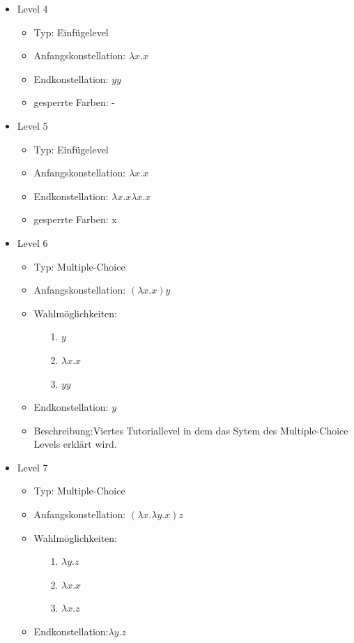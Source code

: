 \begin{itemize}
	\item{Level 4} 
		\begin{itemize}
			\item{Typ:} Einfügelevel
			\item{Anfangskonstellation:} \(\lambda x . x \)    
			\item{Endkonstellation:} \(y y\)
			\item{gesperrte Farben:} - 
		\end{itemize}

	\item{Level 5} 
		\begin{itemize}
			\item{Typ:} Einfügelevel
			\item{Anfangskonstellation:} \(\lambda x . x \)    
			\item{Endkonstellation:}  \(\lambda x . x  \lambda x . x  \)
			\item{gesperrte Farben:} x
		\end{itemize}

	\item{Level 6} 
		\begin{itemize}
			\item{Typ:} Multiple-Choice 
			\item{Anfangskonstellation:} \((\lambda x . x ) y\)    
			\item{Wahlmöglichkeiten:}  
				\begin{itemize}
					\item[1.] \(y\)
					\item[2.] \(\lambda x . x \) 
					\item[3.] \(y y\)
				\end{itemize}
			\item{Endkonstellation:} \(y\)
			\item{Beschreibung:}Viertes Tutoriallevel in dem das Sytem des Multiple-Choice Levels erklärt wird.
		\end{itemize}

	\item{Level 7} 
		\begin{itemize}
			\item{Typ:} Multiple-Choice 
			\item{Anfangskonstellation:} \((\lambda x . \lambda y . x ) z\)    
			\item{Wahlmöglichkeiten:}  
				\begin{itemize}
					\item[1.] \( \lambda y . z\) 
					\item[2.] \( \lambda x . x \) 
					\item[3.] \( \lambda x . z\)
				\end{itemize}
			\item{Endkonstellation:}\( \lambda y . z\)
		\end{itemize}
\end{itemize}
